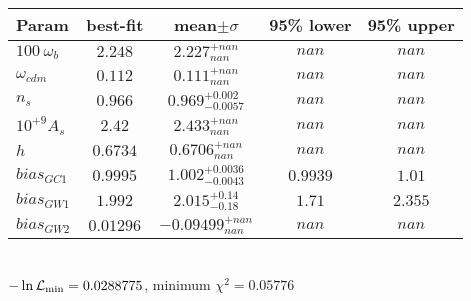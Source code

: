 \begin{tabular}{|l|c|c|c|c|} 
 \hline 
Param & best-fit & mean$\pm\sigma$ & 95\% lower & 95\% upper \\ \hline 
$100~\omega_{b }$ &$2.248$ & $2.227_{nan}^{+nan}$ & $nan$ & $nan$ \\ 
$\omega_{cdm }$ &$0.112$ & $0.111_{nan}^{+nan}$ & $nan$ & $nan$ \\ 
$n_{s }$ &$0.966$ & $0.969_{-0.0057}^{+0.002}$ & $nan$ & $nan$ \\ 
$10^{+9}A_{s }$ &$2.42$ & $2.433_{nan}^{+nan}$ & $nan$ & $nan$ \\ 
$h$ &$0.6734$ & $0.6706_{nan}^{+nan}$ & $nan$ & $nan$ \\ 
$bias_{GC 1 }$ &$0.9995$ & $1.002_{-0.0043}^{+0.0036}$ & $0.9939$ & $1.01$ \\ 
$bias_{GW 1 }$ &$1.992$ & $2.015_{-0.18}^{+0.14}$ & $1.71$ & $2.355$ \\ 
$bias_{GW 2 }$ &$0.01296$ & $-0.09499_{nan}^{+nan}$ & $nan$ & $nan$ \\ 
\hline 
 \end{tabular} \\ 
$-\ln{\cal L}_\mathrm{min} =0.0288775$, minimum $\chi^2=0.05776$ \\ 
